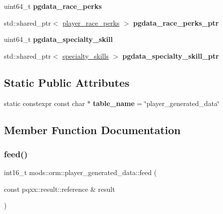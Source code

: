 \begin{DoxyCompactItemize}
uint64\+\_\+t {\bfseries pgdata\+\_\+race\+\_\+perks}
\item 
\mbox{\label{structmods_1_1orm_1_1player__generated__data_abb6ac4d1a2f867c6aad0c20f829574a6}} 
std\+::shared\+\_\+ptr$<$ \hyperlink{structmods_1_1orm_1_1player__race__perks}{player\+\_\+race\+\_\+perks} $>$ {\bfseries pgdata\+\_\+race\+\_\+perks\+\_\+ptr}
\item 
\mbox{\label{structmods_1_1orm_1_1player__generated__data_adfbc57757f3e979ceeaad393f4b774e0}} 
uint64\+\_\+t {\bfseries pgdata\+\_\+specialty\+\_\+skill}
\item 
\mbox{\label{structmods_1_1orm_1_1player__generated__data_a53472575217d697f8c9861a465017025}} 
std\+::shared\+\_\+ptr$<$ \hyperlink{structmods_1_1orm_1_1specialty__skills}{specialty\+\_\+skills} $>$ {\bfseries pgdata\+\_\+specialty\+\_\+skill\+\_\+ptr}
\end{DoxyCompactItemize}
\subsection*{Static Public Attributes}
\begin{DoxyCompactItemize}
\item 
\mbox{\label{structmods_1_1orm_1_1player__generated__data_a7d413bdc544be304bac10bbafa770a81}} 
static constexpr const char $\ast$ {\bfseries table\+\_\+name} = \char`\"{}player\+\_\+generated\+\_\+data\char`\"{}
\end{DoxyCompactItemize}


\subsection{Member Function Documentation}
\mbox{\label{structmods_1_1orm_1_1player__generated__data_ac6a622c219c6d50c3f054aef965e4363}} 
\subsubsection{\texorpdfstring{feed()}{feed()}}
{\footnotesize\ttfamily int16\+\_\+t mods\+::orm\+::player\+\_\+generated\+\_\+data\+::feed (\begin{DoxyParamCaption}\item[{const pqxx\+::result\+::reference \&}]{result }\end{DoxyParamCaption})\hspace{0.3cm}{\ttfamily [virtual]}}

